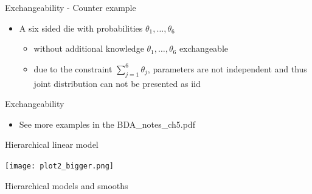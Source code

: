 \documentclass[finnish,english,t]{beamer}
\begin{document}
\begin{frame}{Exchangeability - Counter example}

  \begin{itemize}
  \item A six sided die with probabilities %
    $\theta_1,\ldots,\theta_6$
    \begin{itemize}
    \item without additional knowledge $\theta_1,\ldots,\theta_6$
      exchangeable
    \item due to the constraint $\sum_{j=1}^6\theta_j$, parameters
      are not independent and thus joint distribution can not be
      presented as iid %
    \end{itemize}
  \end{itemize}
\end{frame}

 \begin{frame}

   {\Large\color{navyblue} Exchangeability}

   \begin{itemize}
   \item See more examples in the BDA\_notes\_ch5.pdf
   \end{itemize}

 \end{frame}

\begin{frame}{Hierarchical linear model}

  \centering
  {\texttt{[image: plot2\_bigger.png]}}

\end{frame}

\begin{frame}{Hierarchical models and smooths}

  
\end{frame}
  
\end{document}
